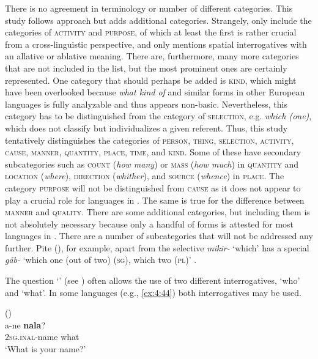 There is no agreement in terminology or number of different categories. This study follows  approach but adds additional categories. Strangely, only \citet{Heine1991} include the categories of \textsc{activity} and \textsc{purpose}, of which at least the first is rather crucial from a cross-linguistic perspective, and only \citet{Diessel2003} mentions spatial interrogatives with an allative or ablative meaning. There are, furthermore, many more categories that are not included in the list, but the most prominent ones are certainly represented. One category that should perhaps be added is \textsc{kind}, which might have been overlooked because  \textit{what kind of} and similar forms in other European languages is fully analyzable and thus appears non-basic. Nevertheless, this category has to be distinguished from the category of \textsc{selection}, e.g.  \textit{which (one)}, which does not classify but individualizes a given referent. Thus, this study tentatively distinguishes the categories of \textsc{person}, \textsc{thing}, \textsc{selection}, \textsc{activity}, \textsc{cause}, \textsc{manner}, \textsc{quantity}, \textsc{place}, \textsc{time}, and \textsc{kind}. Some of these have secondary subcategories such as \textsc{count} (\textit{how many}) or \textsc{mass} (\textit{how much}) in \textsc{quantity} and \textsc{location} (\textit{where}), \textsc{direction} (\textit{whither}), and \textsc{source} (\textit{whence}) in \textsc{place}. The category \textsc{purpose} will not be distinguished from \textsc{cause} as it does not appear to play a crucial role for languages in . The same is true for the difference between \textsc{manner} and \textsc{quality}. There are some additional categories, but including them is not absolutely necessary because only a handful of forms is attested for most languages in . There are a number of subcategories that will not be addressed any further. Pite  (), for example, apart from the selective  \textit{mikir-} ‘which’ has a special  \textit{gåb-} ‘which one (out of two) (\textsc{sg}), which two (\textsc{pl})’ \citep[123]{Wilbur2014}.

The question ‘’ (see \citealt{Idiatov2007}) often allows the use of two different interrogatives, ‘who’ and ‘what’. In some languages (e.g., \ref{ex:4:44}) both interrogatives may be used.

\ea%
    \label{ex:4:44}
     ()\\
    \ea
    \gll a-ne \textbf{{nala}}?\\
    2\textsc{sg.}\textsc{inal}-name  what\\
    \glt ‘What is your name?’

